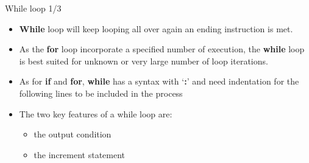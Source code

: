 \documentclass[
  8pt,
  ignorenonframetext,
]{beamer}
\providecommand{\tightlist}{%
  \setlength{\itemsep}{0pt}\setlength{\parskip}{0pt}}
\begin{document}
\begin{frame}{While loop 1/3}
\protect\hypertarget{while-loop-13}{}
\begin{itemize}[<+->]
\tightlist
\item
  \textbf{While} loop will keep looping all over again an ending
  instruction is met.
\end{itemize}

\begin{itemize}[<+->]
\tightlist
\item
  As the \textbf{for} loop incorporate a specified number of execution,
  the \textbf{while} loop is best suited for unknown or very large
  number of loop iterations.
\end{itemize}

\begin{itemize}[<+->]
\tightlist
\item
  As for \textbf{if} and \textbf{for}, \textbf{while} has a syntax with
  `\textbf{:}' and need indentation for the following lines to be
  included in the process
\end{itemize}

\begin{itemize}[<+->]
\tightlist
\item
  The two key features of a while loop are:

  \begin{itemize}[<+->]
  \tightlist
  \item
    the output condition
  \item
    the increment statement
  \end{itemize}
\end{itemize}
\end{frame}
\end{document}
